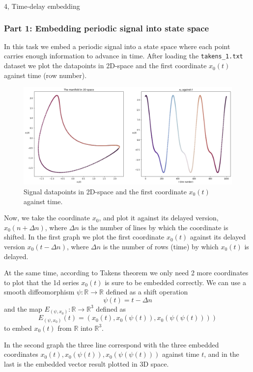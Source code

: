 \documentclass[10pt,a4paper]{article}
\begin{document}
\begin{task}{4, Time-delay embedding}
\subsubsection*{Part 1: Embedding periodic signal into state space}
In this task we embed a periodic signal into a state space where each point carries
enough information to advance in time. After loading the \texttt{takens\_1.txt} dataset we plot the datapoints in 2D-space and the first coordinate $x_0(t)$ against time (row number).

\begin{figure}[H]
    \centering
    \includegraphics[width=14cm]{images/task4-1-0.png}
    \caption{Signal datapoints in 2D-space and the first coordinate $x_0(t)$ against time.}
    \label{task4-1-0}
\end{figure}

Now, we take the coordinate $x_0$, and plot it against its delayed version, $x_0(n+\Delta n)$, where $\Delta n$ is the number of lines by which the coordinate is shifted. In the first graph we plot the first coordinate $x_0(t)$ against its delayed version $x_0(t-\Delta n)$, where $\Delta n$ is the number of rows (time) by which $x_0(t)$ is delayed. 

At the same time, according to Takens theorem we only need 2 more coordinates to plot that the 1d series $x_0(t)$ is sure to be embedded correctly. We can use a smooth diffeomorphism $\psi: \mathbb{R} \rightarrow \mathbb{R}$ defined as a shift operation $$\psi(t) = t-\Delta n$$ 
and the map $E_{(\psi, x_0)}: \mathbb{R} \rightarrow \mathbb{R}^3$ defined as $$E_{(\psi, x_0)}(t)=\left(x_0(t), x_0(\psi(t)), x_0(\psi(\psi(t)))\right)$$ to embed $x_0(t)$ from $\mathbb{R}$ into $\mathbb{R}^3$.

In the second graph the three line correspond with the three embedded coordinates $x_0(t), x_0(\psi(t)), x_0(\psi(\psi(t)))$ against time $t$, and in the last is the embedded vector result plotted in 3D space.


\end{task}
\end{document}
